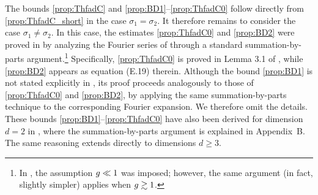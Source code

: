 


The bounds \eqref{prop:ThfadC} and \eqref{prop:BD1}--\eqref{prop:ThfadC0} follow directly from \eqref{prop:ThfadC_short} in the case $\sigma_1=\sigma_2$. It therefore remains to consider the case $\sigma_1\neq \sigma_2$. In this case, the estimates \eqref{prop:ThfadC0} and \eqref{prop:BD2} were proved in \cite{yang2024Del} by analyzing the Fourier series of  through a standard summation-by-parts argument.\footnote{In \cite{yang2024Del}, the assumption $g\ll 1$ was imposed; however, the same argument (in fact, slightly simpler) applies when $g\gtrsim 1$.} 
Specifically, \eqref{prop:ThfadC0} is proved in Lemma 3.1 of \cite{yang2024Del}, while \eqref{prop:BD2} appears as equation (E.19) therein. Although the bound \eqref{prop:BD1} is not stated explicitly in \cite{yang2024Del}, its proof proceeds analogously to those of \eqref{prop:ThfadC0} and \eqref{prop:BD2}, by applying the same summation-by-parts technique to the corresponding Fourier expansion. We therefore omit the details.
These bounds \eqref{prop:BD1}--\eqref{prop:ThfadC0} have also been derived for dimension $d=2$ in \cite[Lemma 3.10]{RBSO1D}, where the summation-by-parts argument is explained in Appendix~B. The same reasoning extends directly to dimensions $d\ge 3$.
 



